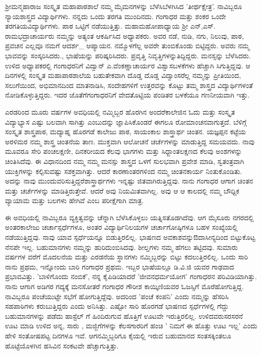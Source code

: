 {ಶ್ರೀಮನ್ಮಹಾರಾಜ ಸಂಸ್ಕೃತ ಮಹಾಪಾಠಶಾಲೆ ನಮ್ಮ ಮೈ\enginline{-}ಮನಗಳನ್ನು ಬೆಳೆಸಿ\break ಬೆಳಗಿಸಿದ 'ತೀರ್ಥಕ್ಷೇತ್ರ'. ನಾವಿಬ್ಬರೂ ನ್ಯಾಯಶಾಸ್ತ್ರದ ವಿದ್ಯಾರ್ಥಿಗಳು. ನನ್ನದು ಒಂದು ತರಗತಿ ಮುಂದಿನದು. ಗಂಗಾಧರ ಮತ್ತು ಶಂಕರ ಒಂದೇ ತರಗತಿಯ\break ವಿದ್ಯಾರ್ಥಿಗಳು. ಪಾಠ ಒಟ್ಟಿಗೆ  ನಡೆಯುತ್ತಿತ್ತು. ಮಹಾಮಹೋಪಾಧ್ಯಾಯ  ಶ್ರೀ ಎನ್,ಎಸ್. ರಾಮಭದ್ರಾಚಾರ್ಯರು ನಮ್ಮನ್ನು ಅತ್ಯಂತ ಆಕರ್ಷಿಸಿದ ಅಧ್ಯಾಪಕರು. ಅವರ ನಡೆ, ನುಡಿ, ನಗು, ನಿಲುವು, ಪಾಠ, ಪ್ರವಚನ ಎಲ್ಲವೂ ನಮಗೆ ಆದರ್ಶ\_ ಆಪ್ಯಾಯನ. ನಮ್ಮೊಳಗೆಲ್ಲ ಅವರೇ ತುಂಬಿಕೊಂಡು ಬಿಟ್ಟಿದ್ದರು. ಅವರು ನಮ್ಮ ಭಾವವನ್ನು ಸಂಸ್ಕರಿಸಿದರು., ಭಾಷೆಯನ್ನು ಪರಿಷ್ಕರಿಸಿದರು. ಪ್ರವೃತ್ತಿ ನಿವೃತ್ತಿಗಳನ್ನು\break ತಿದ್ದಿದ್ದರು. ಮನಸ್ಸನ್ನು ಬೆಳೆಸಿದರು. ಉಳಿದ ಅಧ್ಯಾಪಕರಲ್ಲಿ  ಗಂಗಾಧರನಿಗೆ ವಿದ್ವಾನ್ ಎ.ವೆಂಕಣ್ಣಾಚಾರ್ಯರ ವಿಶ್ವಾಸ\enginline{-}ಬಳಕೆಗಳು ಹೆಚ್ಚಾಗಿ ಸಿಗುತ್ತಿದ್ದವು. ಆ ದಿನಗಳಲ್ಲಿ ಸಂಸ್ಕೃತ  ಮಹಾಪಾಠಶಾಲೆಯ  ಬಹುತೇಕವಾಗಿ ದೊಡ್ಡ ದೊಡ್ಡ ವಿದ್ವಾಂಸರೆಲ್ಲ  ನಮ್ಮನ್ನು ಪ್ರೀತಿಯಿಂದ, ಸಲುಗೆಯಿಂದ, ಅಭಿಮಾನದಿಂದ ಮಾತನಾಡಿಸಿ, ಸಂದೇಹಗಳಿಗೆ ಉತ್ತರವನ್ನು ಕೊಟ್ಟು ತಮ್ಮ ಶಾಸ್ತ್ರದ ವಿದ್ಯಾರ್ಥಿಗಳಂತೆ ನೋಡಿಕೊಳ್ಳುತ್ತಿದ್ದರು. ಇದರ ಜೊತೆಗೆ\break ಗಂಗಾಧರನಿಗೆ ವೇದತೊಟ್ಟಿಯ  ಪಂಡಿತರ ಬಳಕೆಯೂ ಗಣನೀಯವಾಗಿ ಇತ್ತು. 

ಎರಡರಿಂದ ಮೂರು ವರ್ಷಗಳ ಅವಧಿಯಲ್ಲಿ ನಮ್ಮಿಬ್ಬರ ಹೊರಗಿನ  ಅಂದರೆ\break ಕಾಲೇಜಿನ ಓದು ಮತ್ತು ಸಂಸ್ಕೃತ ವಿದ್ಯಾಭ್ಯಾಸ ಎಷ್ಟು ಬಲವಾಗಿ ಸಾಗಿತ್ತು ಎಂಬುದನ್ನು  ಜ್ಞಾಪಿಸಿಕೊಂಡರೆ ಈಗಲೂ ರೋಮಾಂಚನವಾಗುತ್ತದೆ. ಬೆಳಿಗ್ಗೆ ಸಂಸ್ಕೃತ ಶಾಸ್ತ್ರಪಾಠ, ಮದ್ಯಾಹ್ನ ಹೊರಗಡೆ ಕಾಲೇಜು ಪಾಠ, ಸಾಯಂಕಾಲ ಶಾಸ್ತ್ರಾರ್ಥ ಚಿಂತನ. ಯಜ್ಞಪ್ಪನ ಕಟ್ಟೆಯ  ಅರಳಿಮರ ನಮ್ಮ ಶಾಸ್ತ್ರ ಚಿಂತನೆಯ ತಾಣ. ಮುಕ್ತವಾಗಿ ಆಲೋಚನೆ ಚರ್ಚೆ\-ಗಳನ್ನು ಮಾಡುತ್ತಿದ್ದ ಸಮಯವದು. ನಾವು ಮೂವರೂ ಸೇರಿ ಪಂಚಲಕ್ಷಣೀ, ದಿನಕರೀಯದ ಕೆಲವು ಭಾಗಗಳು ಮತ್ತು ಸಿಧ್ದಾಂತಲಕ್ಷಣದ ಕೆಲವು ಅಂಶಗಳನ್ನು ಚಿಂತಿಸಿದೆವು. ಈ  ವಿಧಾನದಿಂದ ನಮ್ಮ  ನಮ್ಮ ಮನಸ್ಸು  ಶಾಸ್ತ್ರದ ಒಳಗೆ ಸುಲಭವಾಗಿ ಪ್ರವೇಶ ಮಾಡಿ, ಸ್ವತಂತ್ರವಾಗಿ ಯುಕ್ತಿಗಳನ್ನು  ಕಲ್ಪಿಸುವಷ್ಟು ಸಶಕ್ತವಾಗಿತ್ತು. ಆದರೆ ಕಾರಣಾಂತರಗಳಿಂದ ನಮ್ಮ ಚಿಂತನಕಾರ್ಯ ನಿಂತುಕೊಂಡಿತು. ಅದನ್ನು ನಾವು ಮುಂದುವರಿಸುತ್ತಿದ್ದರೆ\break ಶಾಸ್ತ್ರಾರ್ಥಗಳು ಇನ್ನಷ್ಟು ಜಿತವಾಗಿರುತ್ತಿದ್ದವು. ನಾನು ಗಂಗಾಧರ ಆಗಾಗ ಚಿಂತನ ಮತ್ತು ಚರ್ಚೆಗಳನ್ನು ಮಾಡಿತ್ತಿರುತ್ತೇವೆ. ಆದರೆ ಅವು ನಿಯಮಿತವಾಗಿಲ್ಲ. ಅವು ಆ ಆ ಕಾಲದಲ್ಲಿ ನಮ್ಮ ಬೌಧ್ದಿಕ ವ್ಯಾಯಾಮ ಮತ್ತು ಬಲಗಳು ಹೇಗಿವೆ ಎಂಬ ಪರೀಕ್ಷೆಗಾಗಿ ಮಾತ್ರ.

ಈ ಅವಧಿಯಲ್ಲಿ ನಾವಿಬ್ಬರೂ ವ್ಯಕ್ತಿತ್ವವನ್ನು ಚೆನ್ನಾಗಿ ಬೆಳೆಸಿಕೊಳ್ಳಲು ಯತ್ನಿಸ\-ತೊಡಗಿದೆವು. ಆಗ ಮೈಸೂರು ನಗರದಲ್ಲಿ ಅಂತರಕಾಲೇಜು ಚರ್ಚಾಸ್ಪರ್ಧೆಗಳೂ, ಅಂತರ ವಿದ್ಯಾರ್ಥಿನಿಲಯಗಳ ಚರ್ಚಾಗೋಷ್ಠಿಗಳೂ ಬಹಳ ಸಂಖ್ಯೆಯಲ್ಲಿ ನಡೆಯು\-ತ್ತಿದ್ದವು. ನಾವು ಯಾವ ಸ್ಪರ್ಧೆಯನ್ನೂ ಬಿಡುತ್ತಿರಲಿಲ್ಲ. ಭಾಷಣದ ಅವಕಾಶವನ್ನು\break ಔದಾಸೀನ್ಯದಿಂದ ಬಿಟ್ಟುಕೊಟ್ಟ ನೆನಪೇ ಇಲ್ಲ. ಬಹುಮಾನಗಳು ನಮ್ಮನ್ನು ಹುರಿದುಂಬಿ\-ಸಿದವು. ಶೀಲ್ಡಗಳು ನಮ್ಮ ಹೆಗಲು ತಟ್ಟಿದವು. ಸುಮಾರು ವರ್ಷಗಳ ವರೆಗೆ ಮೊದಲನೆಯ ಮತ್ತು ಎರಡನೆಯ ಸ್ಥಾನಗಳು ನಮ್ಮಿಬ್ಬರನ್ನು ಬಿಟ್ಟು ಕದಲುತ್ತಿರಲಿಲ್ಲ. ಒಂದು ಸಾರಿ ನಾನು ಪ್ರಥಮ, ಇನ್ನೋಂದು ಬಾರಿ ಗಂಗಾಧರ  ಪ್ರಥಮ. ಇಬ್ಬರ ಭಾಷೆಯಲ್ಲೂ ಡಿ.ವಿ.ಜಿ ಯವರ ಗಾಢವಾದ ಪ್ರಭಾವವಿತ್ತು. 'ಬಾಳಿಗೊಂದು ನಂಬಿಕೆ', ನನ್ನ ಕೈಪಿಡಿಯಾದರೆ 'ಜೀವನಧರ್ಮಯೋಗ' ಗಂಗಾಧರನ ಪರಿವಿಡಿಯಾಗಿತ್ತು. ನಾನು ಆಗಾಗ ಅಡಿಗರ ಗದ್ಯಕ್ಕೆ   ಮನಸೋತರೆ ಗಂಗಾಧರ ಗೌರೀಶ ಕಾಯ್ಕಿಣಿಯವರ ಓಜಸ್ಸಿಗೆ ಮೊರೆಹೋಗುತ್ತಿದ್ದ. ನಾವಿಬ್ಬರೂ ಪಂಚೆಯುಟ್ಟೇ ಸಭೆಗೆ ಹೋಗುತ್ತಿದ್ದೆವು. ಅದರಿಂದ 'ಪಂಚೆ ಕಂಪನಿ' ಎಂದು ನಮ್ಮನ್ನು ಹೆಸರಿಸಿ ಸಹಪಾಠಿಗಳು  ಕರುಬುತ್ತಿದ್ದರು ಎಂದು ಅನಿ\-ಸಿತ್ತು. ಎಷ್ಟೋ ಸಾರಿ ಹೊರಗಡೆ ಭಾಷಣದ ಸ್ಪರ್ಧೆಗಳಲ್ಲಿ ಗೆದ್ದು ಬಹುಮಾನಗಳನ್ನು ಪಡೆದು ಹಾಸ್ಟೆಲ್ ಗೆ  ಹಿಂದಿರುಗುವ  ಹೊತ್ತಿಗೆ ಊಟವೇ ಇರುತ್ತಿರಲಿಲ್ಲ. ಉಳಿದವರು\break ಸರಸರನೆ ಊಟ ಮಾಡಿ ಉಳಿದ ಅನ್ನ, ಸಾರು , ಮಜ್ಜಿಗೆಗಳನ್ನು ಕೆಲಸಗಾರರಿಗೆ ಹಂಚಿ ' ನಿಮಗೆ ಈ ಹೊತ್ತು ಊಟ ಇಲ್ಲ' ಎಂದು ಹೇಳಿ  ಸಂತೋಷಪಟ್ಟ ದಿನಗಳೂ ಇವೆ. ಆಗ\break ನಮ್ಮಿಬ್ಬರಿಗೂ ಕೈಯಲ್ಲಿ ಇರುವ ಬಹುಮಾನದ ಸಂತಸಕ್ಕಿಂತಲೂ ಹೊಟ್ಟೆಯೊಳಗಿನ ಹಸಿವಿನ ಸಂಕಟವೇ ಹೆಚ್ಚಾಗುತ್ತಿತ್ತು.

}
